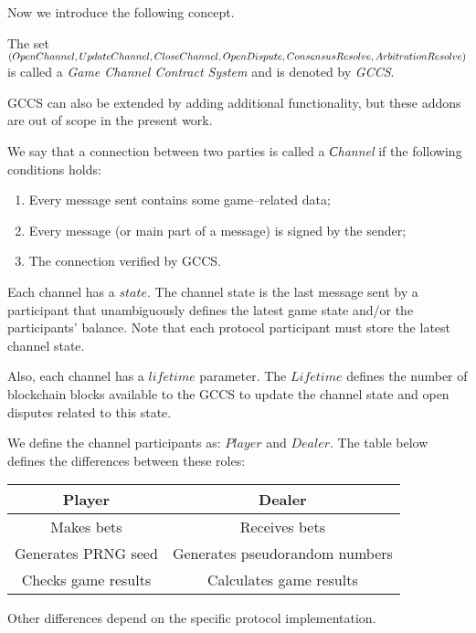 Now we introduce the following concept. 
\begin{defn}
The set $ (OpenChannel, UpdateChannel, CloseChannel,\\ OpenDispute,  ConsensusResolve, ArbitrationResolve) $
is called a \textit {Game Channel Contract System} and is denoted by \textit {GCCS}. 
\end{defn}

\begin{remark}
GCCS can also be extended by adding additional functionality, but these addons are out of scope in the present work. 
\end{remark}

\begin{defn}
We say that a connection between two parties is called a \textit {Сhannel} if the following conditions holds:
	\begin{enumerate}
		\item Every message sent contains some game--related data;
		\item Every message (or main part of a message) is signed by the sender;
		\item The connection verified by GCCS. 
	\end{enumerate}
\end{defn}

Each channel has a $state$. The channel state is the last message sent by a participant that unambiguously defines the latest game state and/or the participants' balance. Note that each protocol participant must store the latest channel state. 

Also, each channel has a $lifetime$ parameter. The $Lifetime$ defines the number of blockchain blocks available to the GCCS to update the channel state and open disputes related to this state. 

We define the channel participants as: $Player$ and $Dealer$. The table below defines the differences between these roles:
\begin{center}
\begin{tabular}{ |c|c| } 
 \hline
 \textbf{Player} & \textbf{Dealer} \\ 
 \hline
 Makes bets & Receives bets \\ 
 Generates PRNG seed & Generates pseudorandom numbers \\ 
 Checks game results & Calculates game results\\
 \hline
\end{tabular}
\end{center}
Other differences depend on the specific protocol implementation.

